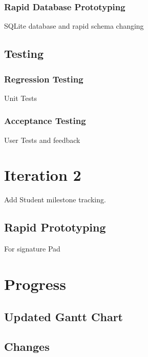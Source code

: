 \documentclass{journal}
\begin{document}
\subsubsection{Rapid Database Prototyping}
SQLite database and rapid schema changing
\subsection{Testing}
\subsubsection{Regression Testing}
Unit Tests
\subsubsection{Acceptance Testing}
User Tests and feedback
\newpage
\section{Iteration 2}
Add Student milestone tracking.
\subsection{Rapid Prototyping}
For signature Pad
\section{Progress}
\subsection{Updated Gantt Chart}
\subsection{Changes}

\end{document}
